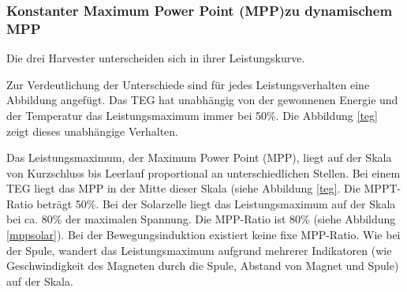 \subsubsection{Konstanter Maximum Power Point (MPP)zu dynamischem MPP}
\label{mpp_theorie_diff}

Die drei Harvester unterscheiden sich in ihrer Leistungskurve. 

Zur Verdeutlichung der Unterschiede sind für jedes Leistungsverhalten eine Abbildung angefügt. Das TEG hat unabhängig von der gewonnenen Energie und der Temperatur das Leistungsmaximum immer bei 50\thinspace\%. Die Abbildung \ref{teg} zeigt dieses unabhängige Verhalten. 


Das Leistungsmaximum, der Maximum Power Point (MPP), liegt auf der Skala von Kurzschluss bis Leerlauf proportional an unterschiedlichen Stellen.  Bei einem TEG liegt das MPP in der Mitte dieser Skala (siehe Abbildung \ref{teg}. Die MPPT-Ratio beträgt 50\thinspace\%. Bei der Solarzelle liegt das Leistungsmaximum auf der Skala bei ca. 80\thinspace\% der maximalen Spannung. Die MPP-Ratio ist 80\thinspace\% (siehe Abbildung \ref{mppsolar}). Bei der Bewegungsinduktion existiert keine fixe MPP-Ratio. Wie bei der Spule, wandert das Leistungsmaximum aufgrund mehrerer Indikatoren (wie Geschwindigkeit des Magneten durch die Spule, Abstand von Magnet und Spule) auf der Skala.



